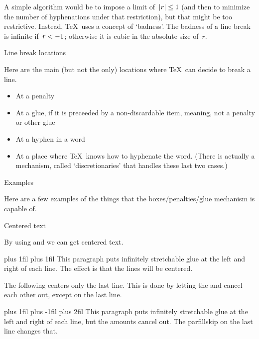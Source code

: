 A simple algorithm would be to impose a limit of~$|r|\leq\nobreak1$
(and then to minimize the number of hyphenations under that restriction),
but that might be too restrictive. Instead, \TeX\ uses a concept of
`badness'.  The badness of a line break
is infinite if~$r<\nobreak -1$; otherwise it is cubic in the absolute
size of~$r$.

 {Line break locations}

Here are the main (but not the only) locations where \TeX\ can decide
to break a line.
\begin{itemize}
\item At a penalty
\item At a glue, if it is preceeded by a non-discardable item,
  meaning, not a penalty or other glue
\item At a hyphen in a word
\item At a place where \TeX\ knows how to hyphenate the word. (There
  is actually a mechanism, called `discretionaries' that handles these
  last two cases.)
\end{itemize}

 {Examples}

Here are a few examples of the things that the boxes/penalties/glue
mechanism is capable of.

 {Centered text}

By using  and  we can get centered text.
\begin{examplewithcode}
\begin{minipage}{4cm}
\leftskip=0pt plus 1fil \rightskip=0pt plus 1fil
\parfillskip=0pt
This paragraph puts infinitely stretchable glue at 
the left and right of each line.
The effect is that the lines will be centered.
\end{minipage}
\end{examplewithcode}

The following centers only the last line. This is done by letting the
 and  cancel each other out, except on the
last line.
\begin{examplewithcode}
\begin{minipage}{5cm}
\leftskip=0pt plus 1fil \rightskip=0pt plus -1fil
\parfillskip=0pt plus 2fil
This paragraph puts infinitely stretchable glue at 
the left and right of each line, but the amounts cancel out.
The parfillskip on the last line changes that.
\end{minipage}
\end{examplewithcode}

